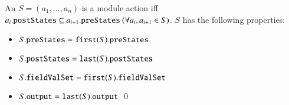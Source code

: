 \begin{definition} \label{def:ase}
	An  $S = (a_1,\dots,a_n)$ is a module action iff $a_i.{\tt postStates} \subseteq a_{i+1}.{\tt preStates} ~(\forall a_i, a_{i+1} \in S)$. %
	$S$ has the following properties:
	\begin{itemize}
		\item $S.\membern{preStates} = \func{first}(S).\membern{preStates}$
		\item $S.\membern{postStates} = \func{last}(S).\membern{postStates}$ 
		\item $S.\membern{fieldValSet} = \func{first}(S).\membern{fieldValSet}$
		\item $S.\membern{output} = \func{last}(S).\membern{output}$ \qed
	\end{itemize}
\end{definition}

